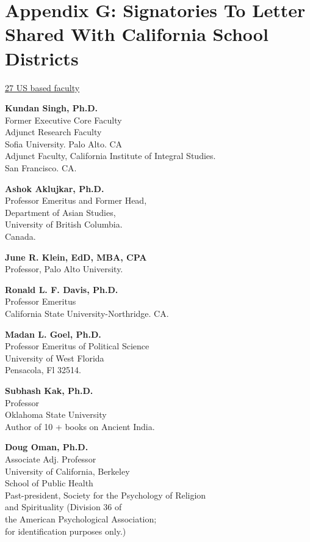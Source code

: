 \chapter{Appendix G: Signatories To Letter Shared With California School Districts}

\centerline{\underline{27 US based faculty}} 

\textbf{Kundan Singh, Ph.D.}\\ 
Former Executive Core Faculty\\
Adjunct Research Faculty\\
Sofia University. Palo Alto. CA\\
Adjunct Faculty, California Institute of Integral Studies.\\ 
San Francisco. CA. 
\medskip

\textbf{Ashok Aklujkar, Ph.D.}\\ 
Professor Emeritus and Former Head,\\ 
Department of Asian Studies,\\ 
University of British Columbia.\\ 
Canada.
\medskip

\textbf{June R. Klein, EdD, MBA, CPA}\\ 
Professor, Palo Alto University.
\medskip

\textbf{Ronald L. F. Davis, Ph.D.}\\ 
Professor Emeritus\\ 
California State University-Northridge. CA.
\medskip

\textbf{Madan L. Goel, Ph.D.}\\ 
Professor Emeritus of Political Science\\
University of West Florida\\
Pensacola, Fl 32514.
\medskip

\textbf{Subhash Kak, Ph.D.}\\ 
Professor\\
Oklahoma State University\\
Author of 10 + books on Ancient India.\\
\medskip

\textbf{Doug Oman, Ph.D.}\\
Associate Adj. Professor\\
University of California, Berkeley\\
School of Public Health\\
Past-president, Society for the Psychology of Religion\\ 
and Spirituality (Division 36 of\\ 
the American Psychological Association;\\  
for identification purposes only.) 
\medskip
 
